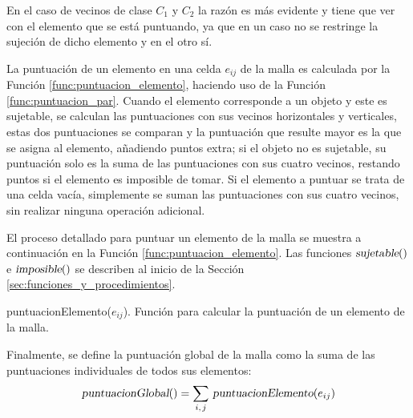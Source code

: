 En el caso de vecinos de clase $C_1$ y $C_2$ la razón es más evidente y tiene que ver con el elemento que se está puntuando, ya que en un caso no se restringe la sujeción de dicho elemento y en el otro sí.

La puntuación de un elemento en una celda $e_{ij}$ de la malla es calculada por la Función \ref{func:puntuacion_elemento}, haciendo uso de la Función \ref{func:puntuacion_par}.
Cuando el elemento corresponde a un objeto y este es sujetable, se calculan las puntuaciones con sus vecinos horizontales y verticales, estas dos puntuaciones se comparan y la puntuación que resulte mayor es la que se asigna al elemento, añadiendo puntos extra; si el objeto no es sujetable, su puntuación solo es la suma de las puntuaciones con sus cuatro vecinos, restando puntos si el elemento es imposible de tomar.
Si el elemento a puntuar se trata de una celda vacía, simplemente se suman las puntuaciones con sus cuatro vecinos, sin realizar ninguna operación adicional.

El proceso detallado para puntuar un elemento de la malla se muestra a continuación en la Función \ref{func:puntuacion_elemento}.
Las funciones $\textsl{sujetable}()$ e $\textsl{imposible}()$ se describen al inicio de la Sección \ref{sec:funciones_y_procedimientos}.
%
\begin{center}
\begin{minipage}{0.9\textwidth}
\begin{function}[H]
	\label{func:puntuacion_elemento}%
	\caption{puntuacionElemento($e_{ij}$). Función para calcular la puntuación de un elemento de la malla.}%
	\OneHalfBlankLine
	\OneHalfBlankLine
\end{function}
\end{minipage}
\end{center}
%
Finalmente, se define la puntuación global de la malla como la suma de las puntuaciones individuales de todos sus elementos:
%
\begin{equation}
\textsl{puntuacionGlobal}() = \sum_{i,\hspace{1pt} j}\, \textsl{puntuacionElemento}(e_{ij})
\end{equation}

